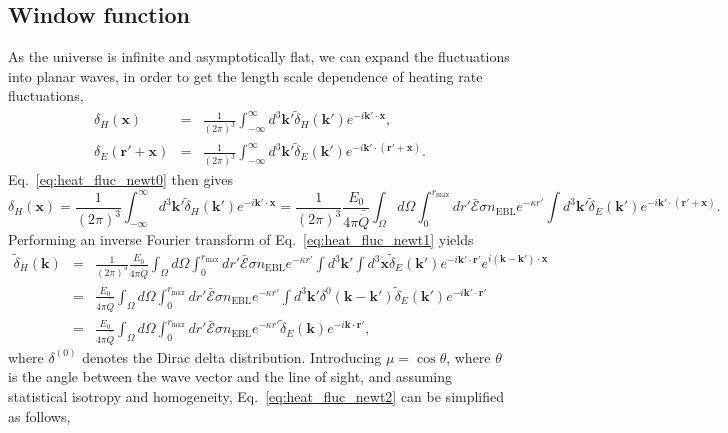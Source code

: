 \documentclass[twocolumns]{emulateapj}
\begin{document}
\subsection{Window function}
As the universe is infinite and asymptotically flat, we can expand the fluctuations into planar waves, in order to get the length scale dependence of heating rate fluctuations,
\begin{eqnarray}
  \label{eq:FT_delta}
  \delta_H(\mathbf{x})&=&\frac{1}{(2\pi)^3}\int_{-\infty}^{\infty} d^3\mathbf{k'} \tilde{\delta}_H(\mathbf{k'}) e^{-i\mathbf{k'}\cdot\mathbf{x}},\\ \nonumber
  \delta_E(\mathbf{r}'+\mathbf{x})&=&\frac{1}{(2\pi)^3}\int_{-\infty}^{\infty} d^3\mathbf{k'} \tilde{\delta}_E(\mathbf{k'}) e^{-i\mathbf{k'}\cdot(\mathbf{r'}+\mathbf{x})}.
\end{eqnarray}
Eq.~\eqref{eq:heat_fluc_newt0} then gives
\begin{equation}
  \label{eq:heat_fluc_newt1}
  \delta_H(\mathbf{x})
  =\frac{1}{(2\pi)^3}\int_{-\infty}^{\infty} d^3\mathbf{k'} \tilde{\delta}_H(\mathbf{k'}) e^{-i\mathbf{k'}\cdot\mathbf{x}}
  =\frac{1}{ (2\pi)^3}\frac{E_0}{4\pi\bar{\dot{Q}}} \int_{\Omega}d\Omega\int_0^{r_{\mathrm{max}}}  dr' \bar{\mathcal{E}}\sigma n_{\mathrm{EBL}} e^{-\kappa r'} \int d^3\mathbf{k'} \tilde{\delta}_E(\mathbf{k'}) e^{-i\mathbf{k'}\cdot(\mathbf{r'}+\mathbf{x})}.
\end{equation}
Performing an inverse Fourier transform of Eq.~\eqref{eq:heat_fluc_newt1} yields
\begin{eqnarray}
  \label{eq:heat_fluc_newt2}
  \tilde{\delta}_H(\mathbf{k})&=& \frac{1}{(2\pi)^3} \frac{E_0}{4\pi\bar{\dot{Q}}}\int_{\Omega}d\Omega\int_0^{r_{\mathrm{max}}} dr'\bar{ \mathcal{E}}\sigma n_{\mathrm{EBL}}  e^{-\kappa r'} \int d^3\mathbf{k'}\int d^3\mathbf{x} \tilde{\delta}_E(\mathbf{k'})e^{-i\mathbf{k'}\cdot{\mathbf{r}'}} e^{i(\mathbf{k}-\mathbf{k'})\cdot\mathbf{x}} \\ \nonumber
  &=&\frac{E_0}{4\pi\bar{\dot{Q}}} \int_{\Omega}d\Omega\int_0^{r_{\mathrm{max}}}   dr' \bar{\mathcal{E}}\sigma n_{\mathrm{EBL}}  e^{-\kappa r'} \int d^3\mathbf{k'} \delta^{0}(\mathbf{k}-\mathbf{k}')\tilde{\delta}_E(\mathbf{k'}) e^{-i\mathbf{k'}\cdot{\mathbf{r}'}}  \\ \nonumber
  &=&\frac{E_0}{4\pi\bar{\dot{Q}}} \int_{\Omega}d\Omega\int_0^{r_{\mathrm{max}}}  dr' \bar{ \mathcal{E}}\sigma n_{\mathrm{EBL}}  e^{-\kappa r'}  \tilde{\delta}_E(\mathbf{k}) e^{-i\mathbf{k}\cdot{\mathbf{r}'}}  ,
\end{eqnarray}
where $\delta^{(0)}$ denotes the Dirac delta distribution. Introducing $\mu=\cos\theta$, where $\theta$ is the angle between the wave vector and the line of sight, and assuming statistical isotropy and homogeneity, Eq.~\eqref{eq:heat_fluc_newt2} can be simplified as follows,
\end{document}
